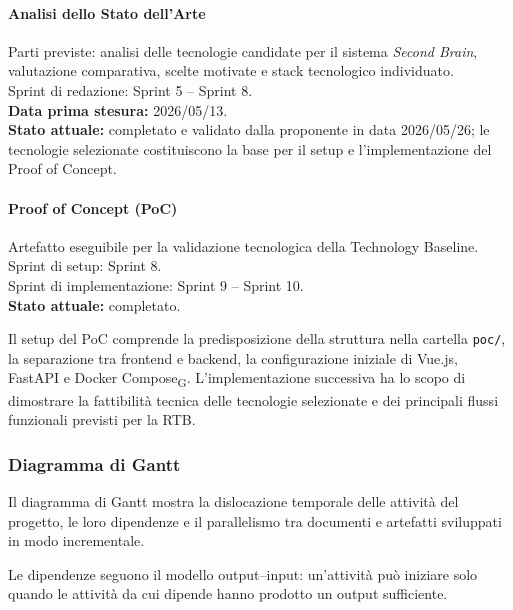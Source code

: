 \paragraph{Analisi dello Stato dell'Arte}
Parti previste: analisi delle tecnologie candidate per il sistema
\textit{Second Brain}, valutazione comparativa, scelte motivate e stack
tecnologico individuato.\\
Sprint di redazione: Sprint 5 -- Sprint 8.\\
\textbf{Data prima stesura:} 2026/05/13.\\
\textbf{Stato attuale:} completato e validato dalla proponente in data
2026/05/26; le tecnologie selezionate costituiscono la base per il setup e
l'implementazione del Proof of Concept.

\paragraph{Proof of Concept (PoC)}
Artefatto eseguibile per la validazione tecnologica della Technology Baseline.\\
Sprint di setup: Sprint 8.\\
Sprint di implementazione: Sprint 9 -- Sprint 10.\\
\textbf{Stato attuale:} completato.

Il setup del PoC comprende la predisposizione della struttura nella cartella
\texttt{poc/}, la separazione tra frontend e backend, la configurazione iniziale
di Vue.js, FastAPI e Docker Compose\textsubscript{G}. L'implementazione
successiva ha lo scopo di dimostrare la fattibilità tecnica delle tecnologie
selezionate e dei principali flussi funzionali previsti per la RTB.

\subsubsection{Diagramma di Gantt}

Il diagramma di Gantt mostra la dislocazione temporale delle attività del
progetto, le loro dipendenze e il parallelismo tra documenti e artefatti
sviluppati in modo incrementale.

Le dipendenze seguono il modello output--input: un'attività può iniziare solo
quando le attività da cui dipende hanno prodotto un output sufficiente.

